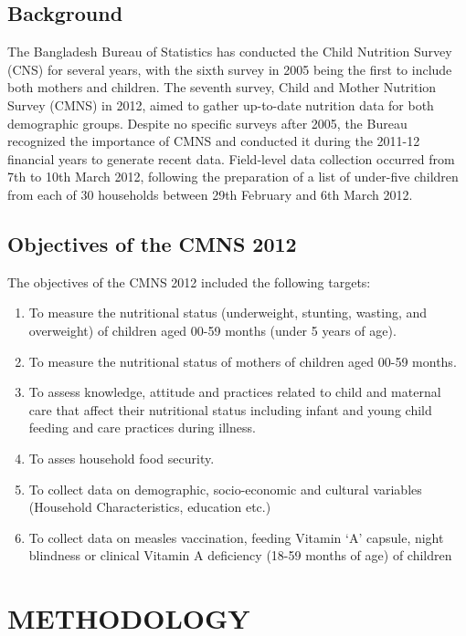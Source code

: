 \documentclass{report}
\begin{document}
\section{Background}


The Bangladesh Bureau of Statistics has conducted the Child Nutrition Survey (CNS) for several years, with the sixth survey in 2005 being the first to include both mothers and children. The seventh survey, Child and Mother Nutrition Survey (CMNS) in 2012, aimed to gather up-to-date nutrition data for both demographic groups. Despite no specific surveys after 2005, the Bureau recognized the importance of CMNS and conducted it during the 2011-12 financial years to generate recent data. Field-level data collection occurred from 7th to 10th March 2012, following the preparation of a list of under-five children from each of 30 households between 29th February and 6th March 2012.

\pagebreak

\section{Objectives of the CMNS 2012}
The objectives of the CMNS 2012 included the following targets:
\begin{enumerate}
\item To measure the nutritional status (underweight, stunting, wasting, and overweight) of
children aged 00-59 months (under 5 years of age).
\item To measure the nutritional status of mothers of children aged 00-59 months.
\item To assess knowledge, attitude and practices related to child and maternal care that affect
their nutritional status including infant and young child feeding and care practices during
illness.
\item To asses household food security.
\item To collect data on demographic, socio-economic and cultural variables (Household
Characteristics, education etc.)
\item To collect data on measles vaccination, feeding Vitamin ‘A’ capsule, night blindness or
clinical Vitamin A deficiency (18-59 months of age) of children 

\end{enumerate}

\chapter{\huge{METHODOLOGY}}
\end{document}
